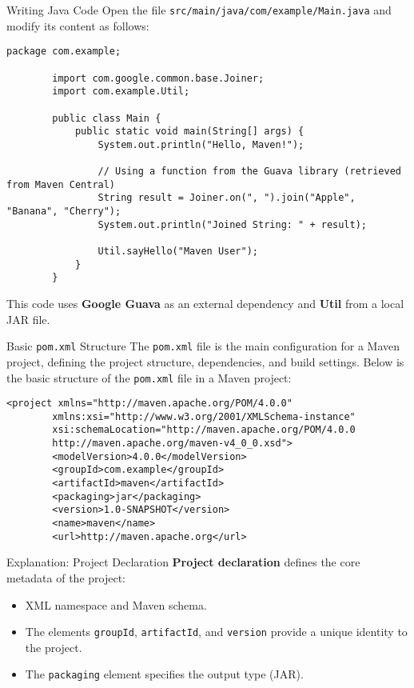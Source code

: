 \documentclass[aspectratio=169, table]{beamer}
\begin{document}
\begin{frame}[fragile]{Writing Java Code}
	Open the file \texttt{src/main/java/com/example/Main.java} and modify its content as follows:
	\begin{lstlisting}[style=JavaStyle]
		package com.example;
		
		import com.google.common.base.Joiner;
		import com.example.Util;
		
		public class Main {
			public static void main(String[] args) {
				System.out.println("Hello, Maven!");
				
				// Using a function from the Guava library (retrieved from Maven Central)
				String result = Joiner.on(", ").join("Apple", "Banana", "Cherry");
				System.out.println("Joined String: " + result);
				
				Util.sayHello("Maven User");
			}
		}
	\end{lstlisting}
	
	This code uses \textbf{Google Guava} as an external dependency and \textbf{Util} from a local JAR file.
\end{frame}

\begin{frame}[fragile]{Basic \texttt{pom.xml} Structure}
		The \texttt{pom.xml} file is the main configuration for a Maven project, defining the project structure, dependencies, and build settings. Below is the basic structure of the \texttt{pom.xml} file in a Maven project:
	\begin{lstlisting}[style=XmlStyle]
		<project xmlns="http://maven.apache.org/POM/4.0.0"
		xmlns:xsi="http://www.w3.org/2001/XMLSchema-instance"
		xsi:schemaLocation="http://maven.apache.org/POM/4.0.0 
		http://maven.apache.org/maven-v4_0_0.xsd">
		<modelVersion>4.0.0</modelVersion>
		<groupId>com.example</groupId>
		<artifactId>maven</artifactId>
		<packaging>jar</packaging>
		<version>1.0-SNAPSHOT</version>
		<name>maven</name>
		<url>http://maven.apache.org</url>
	\end{lstlisting}
\end{frame}

\begin{frame}[fragile]{Explanation: Project Declaration}
	\textbf{Project declaration} defines the core metadata of the project:
	\begin{itemize}
		\item XML namespace and Maven schema.
		\item The elements \texttt{groupId}, \texttt{artifactId}, and \texttt{version} provide a unique identity to the project.
		\item The \texttt{packaging} element specifies the output type (JAR).
	\end{itemize}
\end{frame}
\end{document}
